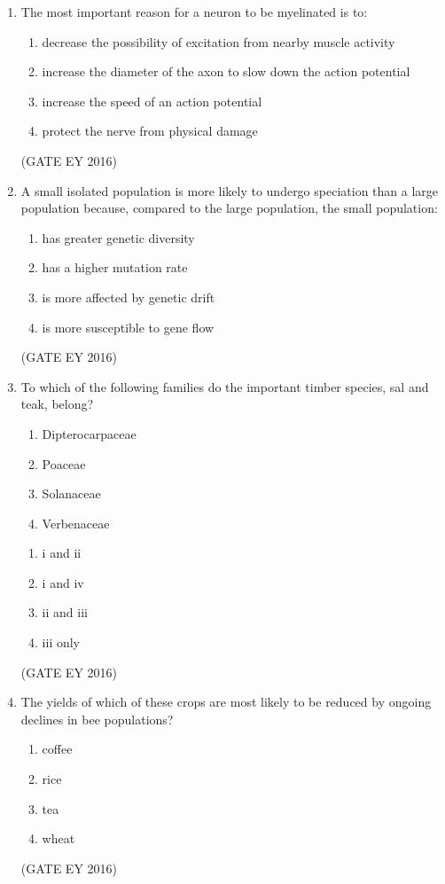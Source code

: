 \documentclass[journal]{IEEEtran}
\begin{document}
\begin{enumerate}[label=Q.\arabic*.]
\item The most important reason for a neuron to be myelinated is to:
\begin{enumerate}
    \item decrease the possibility of excitation from nearby muscle activity
    \item increase the diameter of the axon to slow down the action potential
    \item increase the speed of an action potential
    \item protect the nerve from physical damage
\end{enumerate}
\hfill{(GATE EY 2016)}

\item A small isolated population is more likely to undergo speciation than a large population because, compared to the large population, the small population:
\begin{multicols}{2}
\begin{enumerate}
    \item has greater genetic diversity
    \item has a higher mutation rate
    \item is more affected by genetic drift
    \item is more susceptible to gene flow
\end{enumerate}
\end{multicols}
\hfill{(GATE EY 2016)}

\item To which of the following families do the important timber species, sal and teak, belong? 
    \begin{enumerate}[label=(\roman*)]
        \item Dipterocarpaceae
        \item Poaceae
        \item Solanaceae
        \item Verbenaceae
    \end{enumerate}
\begin{multicols}{4}
\begin{enumerate}
    \item i and ii
    \item i and iv
    \item ii and iii
    \item iii only
\end{enumerate}
\end{multicols}
\hfill{(GATE EY 2016)}

\item The yields of which of these crops are most likely to be reduced by ongoing declines in bee populations?
\begin{multicols}{4}
\begin{enumerate}
    \item coffee
    \item rice
    \item tea
    \item wheat
\end{enumerate}
\end{multicols}
\hfill{(GATE EY 2016)}


\end{enumerate}
\end{document}
